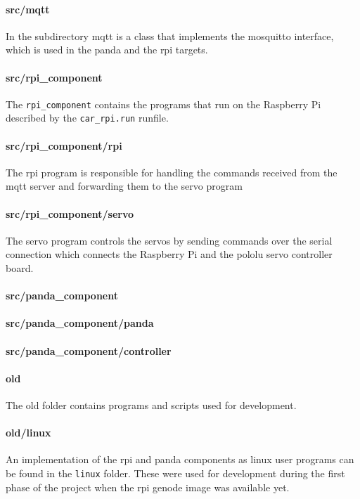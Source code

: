 \paragraph{src/mqtt}
In the subdirectory mqtt is a class that implements the mosquitto interface, which is used in the panda and the rpi targets.

\paragraph{src/rpi\_component}
The \texttt{rpi\_component} contains the programs that run on the Raspberry Pi described by the \texttt{car\_rpi.run} runfile.

\paragraph{src/rpi\_component/rpi}
The rpi program is responsible for handling the commands received from the mqtt server and forwarding them to the servo program

\paragraph{src/rpi\_component/servo}
The servo program controls the servos by sending commands over the serial connection which connects the Raspberry Pi and the pololu servo controller board.

\paragraph{src/panda\_component}

\paragraph{src/panda\_component/panda}

\paragraph{src/panda\_component/controller}

\paragraph{old}
The old folder contains programs and scripts used for development.

\paragraph{old/linux}
An implementation of the rpi and panda components as linux user programs can be found in the \texttt{linux} folder.
These were used for development during the first phase of the project when the rpi genode image was available yet.


